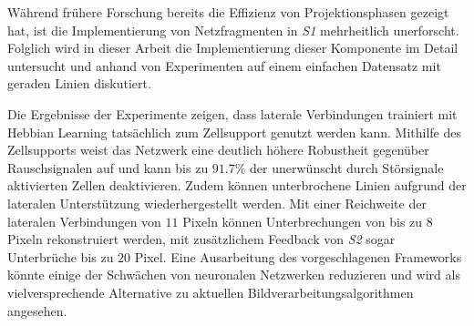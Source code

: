Während frühere Forschung bereits die Effizienz von Projektionsphasen gezeigt hat, ist die Implementierung von Netzfragmenten in \emph{S1} mehrheitlich unerforscht.
Folglich wird in dieser Arbeit die Implementierung dieser Komponente im Detail untersucht und anhand von Experimenten auf einem einfachen Datensatz mit geraden Linien diskutiert.

Die Ergebnisse der Experimente zeigen, dass laterale Verbindungen trainiert mit Hebbian Learning tatsächlich zum Zellsupport genutzt werden kann.
Mithilfe des Zellsupports weist das Netzwerk eine deutlich höhere Robustheit gegenüber Rauschsignalen auf und kann bis zu $91.7\%$ der unerwünscht durch Störsignale aktivierten Zellen deaktivieren. Zudem können unterbrochene Linien aufgrund der lateralen Unterstützung wiederhergestellt werden. Mit einer Reichweite der lateralen Verbindungen von $11$ Pixeln können Unterbrechungen von bis zu $8$ Pixeln rekonstruiert werden, mit zusätzlichem Feedback von \emph{S2} sogar Unterbrüche bis zu $20$ Pixel. Eine Ausarbeitung des vorgeschlagenen Frameworks könnte einige der Schwächen von neuronalen Netzwerken reduzieren und wird als vielversprechende Alternative zu aktuellen Bildverarbeitungsalgorithmen angesehen.
